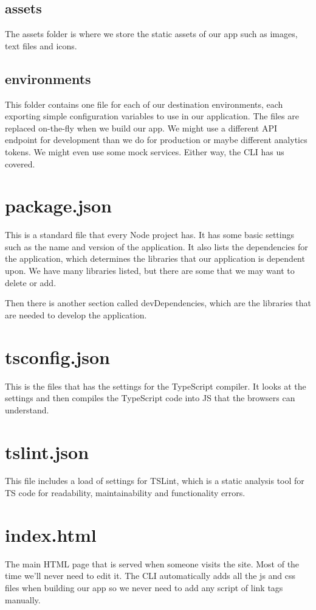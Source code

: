 \subsection{assets}
The assets folder is where we store the static assets of our app such as images, text files and icons.

\subsection{environments}
This folder contains one file for each of our destination environments, each exporting simple
configuration variables to use in our application. The files are replaced on-the-fly when we build
our app. We might use a different API endpoint for development than we do for production or maybe different
analytics tokens. We might even use some mock services. Either way, the CLI has us covered.

\section{package.json}
This is a standard file that every Node project has. It has some basic settings such as the name and version of the application. It also lists the dependencies for the application, which determines the libraries that our application is dependent upon. We have many libraries listed, but there are some that we may want to delete or add.

Then there is another section called devDependencies, which are the libraries that are needed to develop the application.

\section{tsconfig.json}
This is the files that has the settings for the TypeScript compiler. It looks at the settings and then compiles the TypeScript code into JS that the browsers can understand.

\section{tslint.json}
This file includes a load of settings for TSLint, which is a static analysis tool for TS code for readability, maintainability and functionality errors.

\section{index.html}
The main HTML page that is served when someone visits the site. Most of the time we'll never need to edit it. The CLI automatically adds all the js and css files when
building our app so we never need to add any script of link tags manually.

